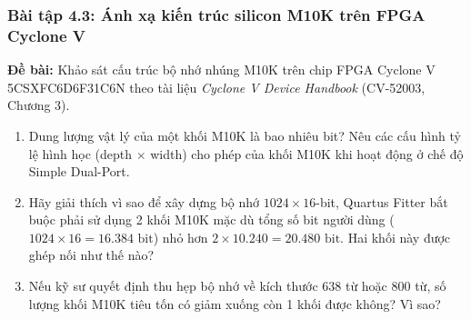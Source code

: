 \subsubsection*{Bài tập 4.3: Ánh xạ kiến trúc silicon M10K trên FPGA Cyclone V}
\textbf{Đề bài:} Khảo sát cấu trúc bộ nhớ nhúng M10K trên chip FPGA Cyclone V 5CSXFC6D6F31C6N theo tài liệu \emph{Cyclone V Device Handbook} (CV-52003, Chương 3).
\begin{enumerate}[label=(\alph*)]
    \item Dung lượng vật lý của một khối M10K là bao nhiêu bit? Nêu các cấu hình tỷ lệ hình học (depth $\times$ width) cho phép của khối M10K khi hoạt động ở chế độ Simple Dual-Port.
    \item Hãy giải thích vì sao để xây dựng bộ nhớ $1024 \times 16$-bit, Quartus Fitter bắt buộc phải sử dụng 2 khối M10K mặc dù tổng số bit người dùng ($1024 \times 16 = 16.384\text{ bit}$) nhỏ hơn $2 \times 10.240 = 20.480\text{ bit}$. Hai khối này được ghép nối như thế nào?
    \item Nếu kỹ sư quyết định thu hẹp bộ nhớ về kích thước 638 từ hoặc 800 từ, số lượng khối M10K tiêu tốn có giảm xuống còn 1 khối được không? Vì sao?
\end{enumerate}

